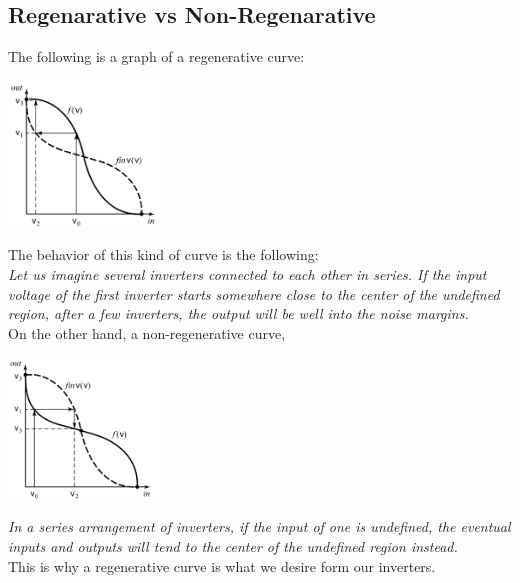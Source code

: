 \documentclass[nobib]{tufte-handout}
\begin{document}
\subsection{Regenarative vs Non-Regenarative}
The following is a graph of a regenerative curve:
\begin{center}
    \includegraphics*[width = 150px]{images/regenerative_curve.png}
\end{center}
The behavior of this kind of curve is the following:\\
\textit{Let us imagine several inverters connected to each other in series. If the input voltage of the first inverter starts somewhere close to the center of the undefined region, after a few inverters, the output will be well into the noise margins.}\\
On the other hand, a non-regenerative curve,
\begin{center}
    \includegraphics*[width = 150px]{images/non_regenerative_curve.png}
\end{center}
\textit{In a series arrangement of inverters, if the input of one is undefined, the eventual inputs and outputs will tend to the center of the undefined region instead.}\\
This is why a regenerative curve is what we desire form our inverters.\\
\end{document}
